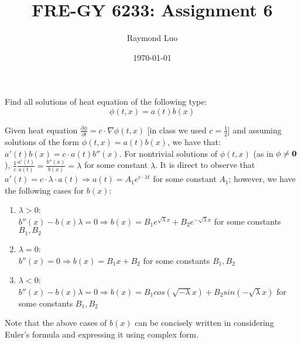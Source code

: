 \documentclass[12pt,twoside, letter]{exam}
\theoremstyle{definition}
\begin{document}
\abovedisplayskip=12pt
\belowdisplayskip=12pt
\abovedisplayshortskip=7pt
\belowdisplayshortskip=10pt
\allowdisplaybreaks

\setlength{\parindent}{18pt}

\title{FRE-GY 6233: Assignment 6}
\author{Raymond Luo}
\date{\today}
\maketitle

 Find all solutions of heat equation of the following type:
\begin{equation*}
  \phi(t,x) = a(t)b(x)
\end{equation*}

\begin{solution}
  Given heat equation $\frac{\partial \phi}{\partial t} = c \cdot \nabla \phi(t,x)$ [in class we
  used $c = \frac{1}{2}$] and assuming solutions of the form $\phi(t,x) = a(t)b(x)$, we have
  that: $a'(t)b(x) = c \cdot a(t)b''(x)$. For nontrivial solutions of $\phi(t,x)$ (as in $\phi \neq {\bf 0}$),
  $\frac{1}{c}\frac{a'(t)}{a(t)} = \frac{b''(x)}{b(x)} = \lambda$ for some constant $\lambda$. It is direct to observe that
  $a'(t) = c\cdot\lambda\cdot a(t) \Rightarrow a(t) = A_1 e^{c\cdot\lambda t}$ for some constant $A_1$; however, we have the following cases for $b(x)$:
  \begin{enumerate}
    \item $\lambda > 0$: \\
      $b''(x) - b(x)\lambda = 0 \Rightarrow b(x) = B_1e^{\sqrt{\lambda}x} + B_2e^{-\sqrt{\lambda}x}$ for some constants $B_1, B_2$\\
    \item $\lambda = 0$: \\
      $b''(x) = 0 \Rightarrow b(x) = B_1x + B_2$ for some constants $B_1, B_2$\\
    \item $\lambda < 0$: \\
      $b''(x) - b(x)\lambda = 0 \Rightarrow b(x) = B_1cos(\sqrt{-\lambda}x) + B_2sin(-\sqrt{\lambda}x)$ for some constants $B_1, B_2$\\
  \end{enumerate}
  Note that the above cases of $b(x)$ can be concisely written in considering Euler's formula and expressing it using complex form.\\

\end{solution}
\end{document}
